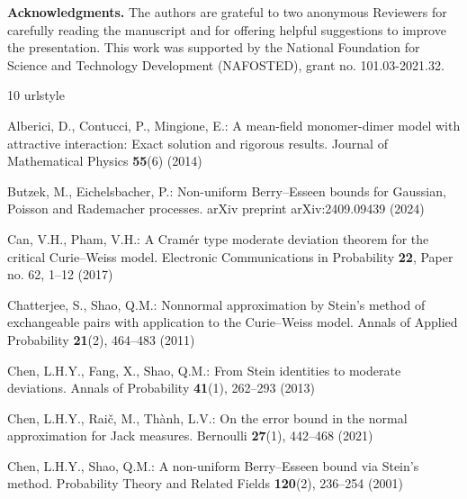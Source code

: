  

 \textbf{Acknowledgments.} The authors are grateful to two anonymous Reviewers for carefully reading the manuscript and for offering
 helpful suggestions to improve the presentation. This work was supported by the National Foundation for Science and Technology Development (NAFOSTED), grant no. 101.03-2021.32.

% 
%

\begin{thebibliography}{10}
	\providecommand{\url}[1]{{#1}}
	\providecommand{\urlprefix}{URL }
	\expandafter\ifx\csname urlstyle\endcsname\relax
	\providecommand{\doi}[1]{DOI~\discretionary{}{}{}#1}\else
	\providecommand{\doi}{DOI~\discretionary{}{}{}\begingroup
		\urlstyle{rm}\Url}\fi
	
	Alberici, D., Contucci, P., Mingione, E.: {A mean-field monomer-dimer model
		with attractive interaction: Exact solution and rigorous results}.
	\newblock Journal of Mathematical Physics \textbf{55}(6) (2014)
	
	Butzek, M., Eichelsbacher, P.: {Non-uniform Berry--Esseen bounds for Gaussian,
		Poisson and Rademacher processes}.
	\newblock arXiv preprint arXiv:2409.09439  (2024)
	
	Can, V.H., Pham, V.H.: {A Cram{\'{e}}r type moderate deviation theorem for the
		critical Curie--Weiss model}.
	\newblock Electronic Communications in Probability \textbf{22}, Paper no. 62,
	1--12 (2017)
	
	Chatterjee, S., Shao, Q.M.: {Nonnormal approximation by Stein’s method of
		exchangeable pairs with application to the Curie--Weiss model}.
	\newblock Annals of Applied Probability \textbf{21}(2), 464--483 (2011)
	
	Chen, L.H.Y., Fang, X., Shao, Q.M.: {From Stein identities to moderate
		deviations}.
	\newblock Annals of Probability \textbf{41}(1), 262--293 (2013)
	
	Chen, L.H.Y., Rai{\v{c}}, M., Th\`{a}nh, L.V.: {On the error bound in the
		normal approximation for Jack measures}.
	\newblock Bernoulli \textbf{27}(1), 442--468 (2021)
	
	Chen, L.H.Y., Shao, Q.M.: {A non-uniform Berry--Esseen bound via Stein's
		method}.
	\newblock Probability Theory and Related Fields \textbf{120}(2), 236--254
	(2001)
	

\end{thebibliography}
